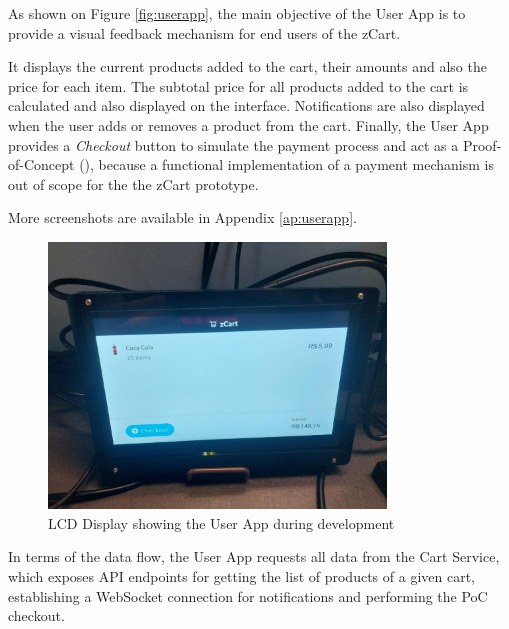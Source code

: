 \documentclass[openright]{normas-utf-tex} %
\begin{document}
As shown on Figure \ref{fig:userapp}, the main objective of the User App is to
provide a visual feedback mechanism for end users of the zCart.

It displays the current products added to the cart, their amounts and also the
price for each item. The subtotal price for all products added to the cart is
calculated and also displayed on the interface. Notifications are also
displayed when the user adds or removes a product from the cart. Finally, the
User App provides a \textit{Checkout} button to simulate the payment process
and act as a Proof-of-Concept (), because a functional
implementation of a payment mechanism is out of scope for the the zCart prototype.

More screenshots are available in Appendix \ref{ap:userapp}.

\begin{figure}[H]
	\centering
	\includegraphics[width=0.8\textwidth]{./images/lcddisplay.jpeg}
	\caption[LCD Display showing the User App during development]{LCD Display showing the User App during development}
	\label{fig:dummy}
\end{figure}

In terms of the data flow, the User App requests all data from the Cart Service, which exposes API endpoints for
getting the list of products of a given cart, establishing a WebSocket connection for notifications and performing
the PoC checkout.
\end{document}
